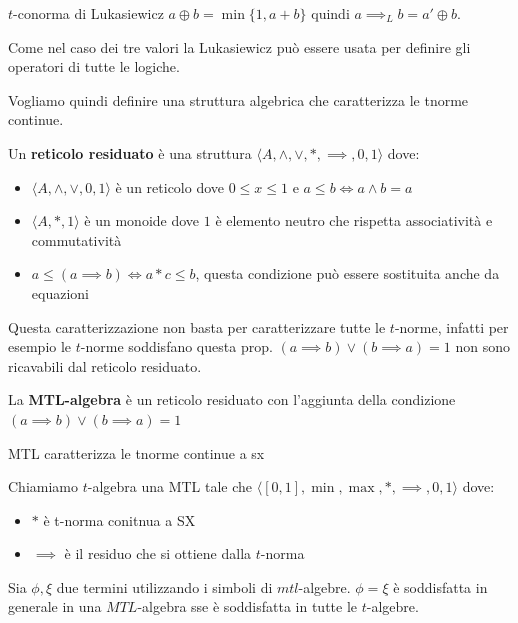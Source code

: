 $t$-conorma di Lukasiewicz $a \oplus b = \min \{1, a+b\}$ quindi $a\implies_L b = a'\oplus b$.

Come nel caso dei tre valori la Lukasiewicz può essere usata per definire gli operatori 
di tutte le logiche.

Vogliamo quindi definire una struttura algebrica che caratterizza le tnorme continue.

\begin{definizione}
    Un \textbf{reticolo residuato} è una struttura $\langle A, \land, \lor, \ast ,\implies,0,1\rangle$
    dove:
    \begin{itemize}
        \item $\langle A, \land, \lor, 0,1\rangle$ è un reticolo dove $0\le x \le 1 $ e 
        $a\le b \iff a\land b =a$
        \item $\langle A,\ast,1\rangle$ è un monoide dove $1$ è elemento neutro che rispetta 
        associatività e commutatività
        \item $a\le (a \implies b) \iff a \ast c \le b$, questa condizione può essere 
        sostituita anche da equazioni
    \end{itemize} 
\end{definizione}

Questa caratterizzazione non basta per caratterizzare tutte le $t$-norme, infatti 
per esempio le $t$-norme soddisfano questa prop. $(a\implies b )\lor (b\implies a) =1 $
non sono ricavabili dal reticolo residuato.

\begin{definizione} 
    La \textbf{MTL-algebra} è un reticolo residuato con l'aggiunta della condizione $(a\implies b )\lor (b\implies a) =1 $
\end{definizione}
MTL caratterizza le tnorme continue a sx

\begin{definizione}
    Chiamiamo $t$-algebra una MTL tale che $\langle [0,1], \min,\max,\ast,\implies, 0,1\rangle$
    dove:
    \begin{itemize}
        \item $\ast$ è t-norma conitnua a SX
        \item $\implies$ è il residuo che si ottiene dalla $t$-norma
    \end{itemize} 
\end{definizione}

\begin{teorema}
    Sia  $\phi, \xi$ due termini utilizzando i simboli di $mtl$-algebre.
    $\phi=\xi$ è soddisfatta in generale in una $MTL$-algebra sse è soddisfatta 
    in tutte le $t$-algebre.
\end{teorema}

